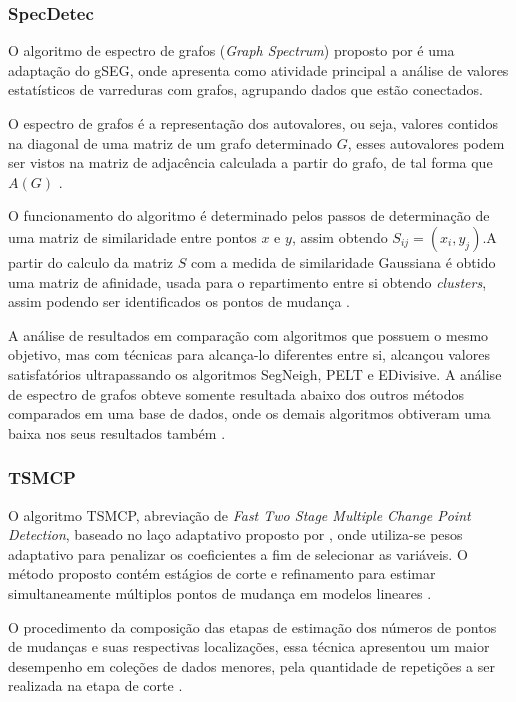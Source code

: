 \subsubsection{SpecDetec}

O algoritmo de espectro de grafos (\textit{Graph Spectrum}) proposto por \cite{Uzai2019} é uma adaptação do gSEG, onde apresenta como atividade principal a análise de valores estatísticos de varreduras com grafos, agrupando dados que estão conectados. 

O espectro de grafos é a representação dos autovalores, ou seja, valores contidos na diagonal de uma matriz de um grafo determinado $G$, esses autovalores podem ser vistos na matriz de adjacência calculada a partir do grafo, de tal forma que $A(G)$ \cite{Uzai2019}. 

O funcionamento do algoritmo é determinado pelos passos de determinação de uma matriz de similaridade entre pontos $x$ e $y$, assim obtendo $S_{ij} = (x_{i}, y_{j})$.A partir do calculo da matriz $S$ com a medida de similaridade Gaussiana é obtido uma matriz de afinidade, usada para o repartimento entre si obtendo \textit{clusters}, assim podendo ser identificados os pontos de mudança \cite{Uzai2019}.

A análise de resultados em comparação com algoritmos que possuem o mesmo objetivo, mas com técnicas para alcança-lo diferentes entre si, alcançou valores satisfatórios ultrapassando os algoritmos SegNeigh, PELT e EDivisive. A análise de espectro de grafos obteve somente resultada abaixo dos outros métodos comparados em uma base de dados, onde os demais algoritmos obtiveram uma baixa nos seus resultados também \cite{Uzai2019}.

\subsubsection{TSMCP}

O algoritmo TSMCP, abreviação de \textit{Fast Two Stage Multiple Change Point Detection}, baseado no laço adaptativo proposto por \cite{Zou2006}, onde utiliza-se pesos adaptativo para penalizar os coeficientes a fim de selecionar as variáveis. O método proposto contém estágios de corte e refinamento para estimar simultaneamente múltiplos pontos de mudança em modelos lineares \cite{Jin2016}. 

O procedimento da composição das etapas de estimação dos números de pontos de mudanças e suas respectivas localizações, essa técnica apresentou um maior desempenho em coleções de dados menores, pela quantidade de repetições a ser realizada na etapa de corte \cite{Jin2016}. 

